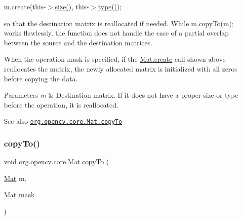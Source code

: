 {\ttfamily }

{\ttfamily }

{\ttfamily m.\+create(this-\/$>$\mbox{\hyperlink{classorg_1_1opencv_1_1core_1_1_mat_a543d6f8a103a5f3d899030d76286f0cf}{size()}}, this-\/$>$\mbox{\hyperlink{classorg_1_1opencv_1_1core_1_1_mat_a555bc7243135e2883afe54e7e5e92c79}{type()}});}

{\ttfamily }

{\ttfamily }

{\ttfamily so that the destination matrix is reallocated if needed. While {\ttfamily m.\+copy\+To(m);} works flawlessly, the function does not handle the case of a partial overlap between the source and the destination matrices. }

When the operation mask is specified, if the {\ttfamily \mbox{\hyperlink{classorg_1_1opencv_1_1core_1_1_mat_a539b0a3690afb6b43047b50cbb787fee}{Mat.\+create}}} call shown above reallocates the matrix, the newly allocated matrix is initialized with all zeros before copying the data.


\begin{DoxyParams}{Parameters}
{\em m} & Destination matrix. If it does not have a proper size or type before the operation, it is reallocated.\\
\hline
\end{DoxyParams}
\begin{DoxySeeAlso}{See also}
\href{http://docs.opencv.org/modules/core/doc/basic_structures.html#mat-copyto}{\tt org.\+opencv.\+core.\+Mat.\+copy\+To} 
\end{DoxySeeAlso}
\mbox{\label{classorg_1_1opencv_1_1core_1_1_mat_ae1a7d7ed81f82bda92cb641c6060f2be}} 
\subsubsection{\texorpdfstring{copy\+To()}{copyTo()}\hspace{0.1cm}{\footnotesize\ttfamily [2/2]}}
{\footnotesize\ttfamily void org.\+opencv.\+core.\+Mat.\+copy\+To (\begin{DoxyParamCaption}\item[{\mbox{\hyperlink{classorg_1_1opencv_1_1core_1_1_mat}{Mat}}}]{m,  }\item[{\mbox{\hyperlink{classorg_1_1opencv_1_1core_1_1_mat}{Mat}}}]{mask }\end{DoxyParamCaption})}


